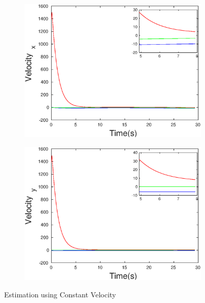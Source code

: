 \begin{figure}[h]
\begin{subfigure}{.5\linewidth}
\centering
\includegraphics[width=.9\linewidth]{figures/Prad/s3cvpradVelocity_x}
\end{subfigure}
\begin{subfigure}{.5\linewidth}
\centering
\includegraphics[width=.9\linewidth]{figures/Prad/s3cvpradVelocity_y}
\end{subfigure}
\caption{Estimation using Constant Velocity}
\end{figure}

